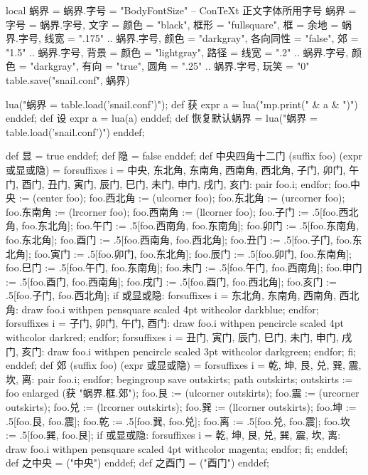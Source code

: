 \startluacode
local 蜗界 = {}
蜗界.字号 = "BodyFontSize" -- ConTeXt 正文字体所用字号
蜗界 = {
    字号 = 蜗界.字号,
    文字 = {颜色 = "black"},
    框形 = "fullsquare",
    框 = {余地 = 蜗界.字号, 
          线宽 = ".175" .. 蜗界.字号, 
          颜色 = "darkgray",
          各向同性 = "false",
          郊 = "1.5" .. 蜗界.字号},
    背景 = {颜色 = "lightgray"},
    路径 = {线宽 = ".2" .. 蜗界.字号,
            颜色 = "darkgray",
            有向 = "true",
            圆角 = ".25" .. 蜗界.字号},
    玩笑 = "0"
}
table.save("snail.conf", 蜗界)
\stopluacode

\startMPinclusions
lua("蜗界 = table.load('snail.conf')");
def 获 expr a = lua("mp.print(" & a & ")") enddef;
def 设 expr a = lua(a) enddef;
def 恢复默认蜗界 =
  lua("蜗界 = table.load('snail.conf')")
enddef;
\stopMPinclusions

\startMPinclusions[+]
def 显 = true enddef;
def 隐 = false enddef;
def 中央四角十二门 (suffix foo) (expr 或显或隐) = 
  forsuffixes i = 中央, 东北角, 东南角, 西南角, 西北角,
                  子门, 卯门, 午门, 酉门,
                  丑门, 寅门, 辰门, 巳门, 未门, 申门, 戌门, 亥门:
    pair foo.i;
  endfor;
  foo.中央 := (center foo);
  foo.西北角 := (ulcorner foo); 
  foo.东北角 := (urcorner foo);
  foo.东南角 := (lrcorner foo);
  foo.西南角 := (llcorner foo);
  foo.子门 := .5[foo.西北角, foo.东北角];
  foo.午门 := .5[foo.西南角, foo.东南角];
  foo.卯门 := .5[foo.东南角, foo.东北角];
  foo.酉门 := .5[foo.西南角, foo.西北角];
  foo.丑门 := .5[foo.子门, foo.东北角];
  foo.寅门 := .5[foo.卯门, foo.东北角];
  foo.辰门 := .5[foo.卯门, foo.东南角];
  foo.巳门 := .5[foo.午门, foo.东南角];
  foo.未门 := .5[foo.午门, foo.西南角];
  foo.申门 := .5[foo.酉门, foo.西南角];
  foo.戌门 := .5[foo.酉门, foo.西北角];
  foo.亥门 := .5[foo.子门, foo.西北角];
  if 或显或隐:
    forsuffixes i = 东北角, 东南角, 西南角, 西北角:
      draw foo.i withpen pensquare scaled 4pt withcolor darkblue;
    endfor;
    forsuffixes i = 子门, 卯门, 午门, 酉门:
      draw foo.i withpen pencircle scaled 4pt withcolor darkred;
    endfor;
    forsuffixes i = 丑门, 寅门, 辰门, 巳门, 未门, 申门, 戌门, 亥门:
      draw foo.i
        withpen pencircle scaled 3pt withcolor darkgreen;
    endfor;
  fi;
enddef;
def 郊 (suffix foo) (expr 或显或隐) = 
  forsuffixes i = 乾, 坤, 艮, 兑, 巽, 震, 坎, 离:
    pair foo.i;
  endfor;
  begingroup
    save outskirts; path outskirts;
  outskirts := foo enlarged (获 "蜗界.框.郊");
  foo.艮 := (ulcorner outskirts); 
  foo.震 := (urcorner outskirts);
  foo.兑 := (lrcorner outskirts);
  foo.巽 := (llcorner outskirts);
  foo.坤 := .5[foo.艮, foo.震];
  foo.乾 := .5[foo.巽, foo.兑];
  foo.离 := .5[foo.兑, foo.震];
  foo.坎 := .5[foo.巽, foo.艮];
  if 或显或隐:
    forsuffixes i = 乾, 坤, 艮, 兑, 巽, 震, 坎, 离:
      draw foo.i withpen pensquare scaled 4pt withcolor magenta;
    endfor;
  fi;
enddef;
def 之中央 = ("中央") enddef;
def 之酉门 = ("酉门") enddef;
\stopMPinclusions

